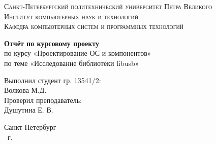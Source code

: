 \begin{titlepage}
    \centering
    \textsc{Санкт-Петербургский политехнический университет Петра Великого}\\[3mm]
    \textsc{Институт компьютерных наук и технологий}\\[3mm]
    \textsc{Кафедра компьютерных систем и программных технологий}
	
	\vfill
	
	\textbf{Отчёт по курсовому проекту}\\[3mm]
	по курсу «Проектирование ОС и компонентов»\\[3mm]
	по теме «Исследование библиотеки libusb»\\[41mm]
	
    \begin{flushright}
	\begin{minipage}{.35\textwidth}
		Выполнил студент гр. 13541/2:\\
		Волкова М.Д.\\[3mm]
		Проверил преподаватель:\\
		Душутина Е. В.
	\end{minipage}
    \end{flushright}
	
	\vfill

	Санкт-Петербург\\
	\the\year\ г.
\end{titlepage}
